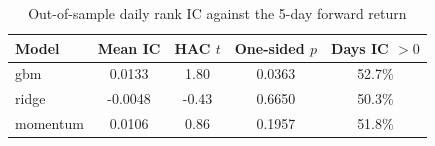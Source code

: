 \begin{table}[H]
\centering
\caption{Out-of-sample daily rank IC against the 5-day forward return}
\begin{tabular}{lcccc}
\toprule
Model & Mean IC & HAC $t$ & One-sided $p$ & Days IC $>0$ \\
\midrule
gbm & 0.0133 & 1.80 & 0.0363 & 52.7\% \\
ridge & -0.0048 & -0.43 & 0.6650 & 50.3\% \\
momentum & 0.0106 & 0.86 & 0.1957 & 51.8\% \\
\bottomrule
\end{tabular}
\end{table}
